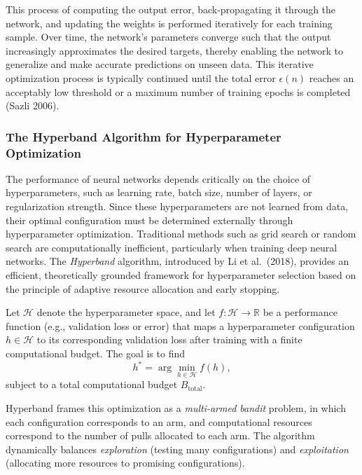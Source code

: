 This process of computing the output error, back-propagating it through the network, and updating the weights is performed iteratively for each training sample. Over time, the network's parameters converge such that the output increasingly approximates the desired targets, thereby enabling the network to generalize and make accurate predictions on unseen data. This iterative optimization process is typically continued until the total error $\epsilon(n)$ reaches an acceptably low threshold or a maximum number of training epochs is completed (Sazli 2006).

\subsubsection{The Hyperband Algorithm for Hyperparameter Optimization}
\label{subsec:hyperband_algorithm}

The performance of neural networks depends critically on the choice of hyperparameters, such as learning rate, batch size, number of layers, or regularization strength. Since these hyperparameters are not learned from data, their optimal configuration must be determined externally through hyperparameter optimization. Traditional methods such as grid search or random search are computationally inefficient, particularly when training deep neural networks. The \textit{Hyperband} algorithm, introduced by Li et al.\ (2018), provides an efficient, theoretically grounded framework for hyperparameter selection based on the principle of adaptive resource allocation and early stopping.

Let $\mathcal{H}$ denote the hyperparameter space, and let $f : \mathcal{H} \rightarrow \mathbb{R}$ be a performance function (e.g., validation loss or error) that maps a hyperparameter configuration $h \in \mathcal{H}$ to its corresponding validation loss after training with a finite computational budget. The goal is to find
\begin{equation}
    h^* = \arg\min_{h \in \mathcal{H}} f(h),
    \label{eq:hyperband_objective}
\end{equation}
subject to a total computational budget $B_{\text{total}}$.

Hyperband frames this optimization as a \emph{multi-armed bandit} problem, in which each configuration corresponds to an arm, and computational resources correspond to the number of pulls allocated to each arm. The algorithm dynamically balances \textit{exploration} (testing many configurations) and \textit{exploitation} (allocating more resources to promising configurations).

